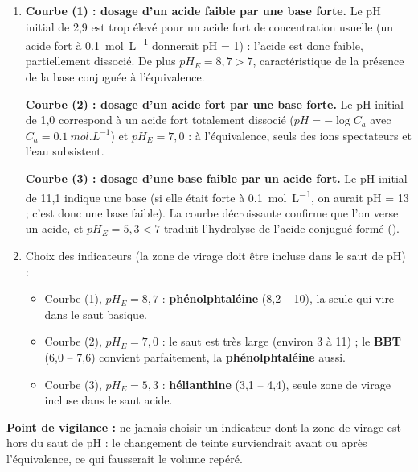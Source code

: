 \documentclass[11pt]{article}
\begin{document}
\begin{corrige}
\begin{enumerate}
\item \textbf{Courbe (1) : dosage d'un acide faible par une base forte.} Le pH initial de 2,9 est trop élevé pour un acide fort de concentration usuelle (un acide fort à \SI{0,1}{mol.L^{-1}} donnerait pH = 1) : l'acide est donc faible, partiellement dissocié. De plus $pH_E = 8,7 > 7$, caractéristique de la présence de la base conjuguée  à l'équivalence.

\textbf{Courbe (2) : dosage d'un acide fort par une base forte.} Le pH initial de 1,0 correspond à un acide fort totalement dissocié ($pH = -\log C_a$ avec $C_a = \SI{0,1}{mol.L^{-1}}$) et $pH_E = 7,0$ : à l'équivalence, seuls des ions spectateurs et l'eau subsistent.

\textbf{Courbe (3) : dosage d'une base faible par un acide fort.} Le pH initial de 11,1 indique une base (si elle était forte à \SI{0,1}{mol.L^{-1}}, on aurait pH = 13 ; c'est donc une base faible). La courbe décroissante confirme que l'on verse un acide, et $pH_E = 5,3 < 7$ traduit l'hydrolyse de l'acide conjugué formé ().
\item Choix des indicateurs (la zone de virage doit être incluse dans le saut de pH) :
\begin{itemize}
\item Courbe (1), $pH_E = 8,7$ : \textbf{phénolphtaléine} (8,2 -- 10), la seule qui vire dans le saut basique.
\item Courbe (2), $pH_E = 7,0$ : le saut est très large (environ 3 à 11) ; le \textbf{BBT} (6,0 -- 7,6) convient parfaitement, la \textbf{phénolphtaléine} aussi.
\item Courbe (3), $pH_E = 5,3$ : \textbf{hélianthine} (3,1 -- 4,4), seule zone de virage incluse dans le saut acide.
\end{itemize}
\end{enumerate}
\textbf{Point de vigilance :} ne jamais choisir un indicateur dont la zone de virage est hors du saut de pH : le changement de teinte surviendrait avant ou après l'équivalence, ce qui fausserait le volume repéré.
\end{corrige}
\end{document}
